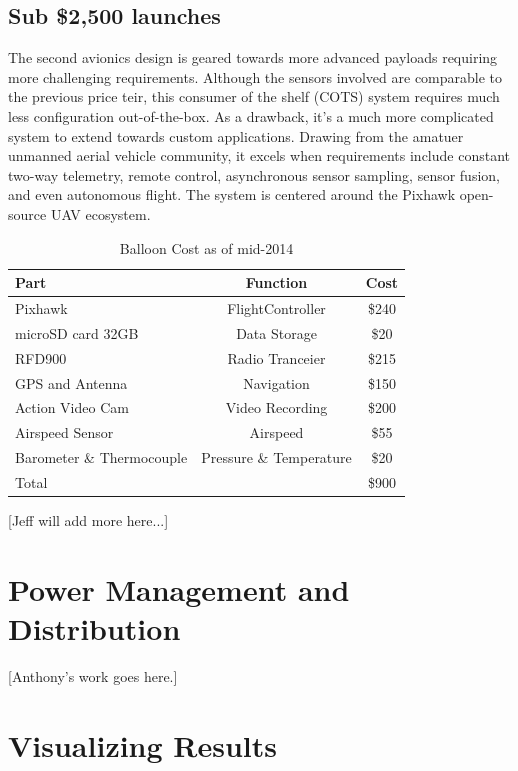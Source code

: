\documentclass[heading.tex]{subfiles}
\begin{document}
\subsection{Sub \$2,500 launches}

The second avionics design is geared towards more advanced payloads requiring
more challenging requirements. Although the sensors involved are comparable to
the previous price teir, this consumer of the shelf (COTS) system requires much
less configuration out-of-the-box. As a drawback, it's a much more complicated
system to extend towards custom applications. Drawing from the amatuer unmanned
aerial vehicle community, it excels when requirements include
constant two-way telemetry, remote control, asynchronous sensor sampling,
sensor fusion, and even autonomous flight. The system is centered around the
Pixhawk open-source UAV ecosystem.

\begin{table}[h]
    \centering
    \caption{Balloon Cost as of mid-2014}
    \label{tab:desvars}
    \begin{tabular}{l  c  c } 
        \hline \hline
        Part &  Function & Cost \\ \hline \hline
        Pixhawk & FlightController & \$240  \\ 
        microSD card 32GB & Data Storage & \$20 \\ 
        RFD900 & Radio Tranceier & \$215 \\ 
        GPS and Antenna & Navigation & \$150\\
        Action Video Cam & Video Recording & \$200\\
        Airspeed Sensor & Airspeed & \$55\\ 
        Barometer \& Thermocouple & Pressure \& Temperature & \$20 \\ \hline
        Total & & \$900 \\ \hline \hline
    \end{tabular}
\end{table}

[Jeff will add more here...]

\section{Power Management and Distribution}

[Anthony's work goes here.]

\section{Visualizing Results}
\end{document}
